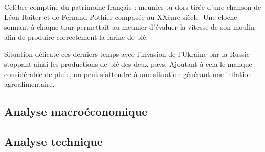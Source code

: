 Célèbre comptine du patrimoine français : meunier tu dors tirée d’une chanson de Léon Raiter et de Fernand Pothier composée au XXème siècle. Une cloche sonnant à chaque tour permettait au meunier d’évaluer la vitesse de son moulin afin de produire correctement la farine de blé.

Situation délicate ces derniers temps avec l’invasion de l’Ukraine par la Russie stoppant ainsi les productions de blé des deux pays. Ajoutant à cela le manque considérable de pluie, on peut s’attendre à une situation générant une inflation agroalimentaire.


\subsection{Analyse macroéconomique}
\subsection{Analyse technique}
